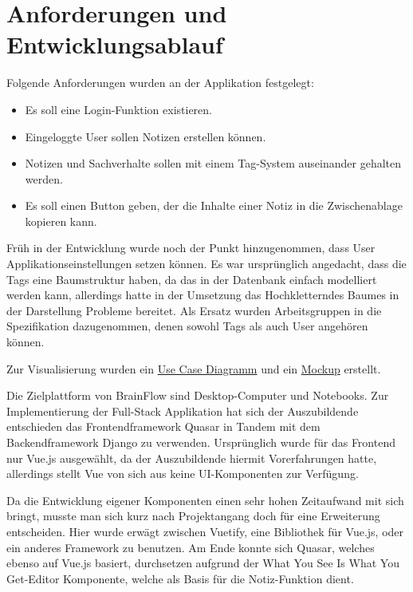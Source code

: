 \section {Anforderungen und Entwicklungsablauf}
Folgende Anforderungen wurden an der Applikation festgelegt:
    \begin{itemize}
        \item Es soll eine Login-Funktion existieren.
        \item Eingeloggte User sollen Notizen erstellen können.
        \item Notizen und Sachverhalte sollen mit einem Tag-System auseinander gehalten werden.
        \item Es soll einen Button geben, der die Inhalte einer Notiz in die Zwischenablage kopieren kann.
    \end{itemize}

\bigskip\noindent
Früh in der Entwicklung wurde noch der Punkt hinzugenommen, dass User Applikationseinstellungen setzen können. Es war ursprünglich angedacht, dass die Tags
eine Baumstruktur haben, da das in der Datenbank einfach modelliert werden kann, allerdings hatte in der Umsetzung das \flqq Hochklettern\frqq des Baumes in der Darstellung
Probleme bereitet. Als Ersatz wurden Arbeitsgruppen in die Spezifikation dazugenommen, denen sowohl Tags als auch User angehören können.

\bigskip\noindent
Zur Visualisierung wurden ein \hyperref[usecase]{Use Case Diagramm} und ein \hyperref[mockup]{Mockup} erstellt.

\bigskip\noindent
Die Zielplattform von BrainFlow sind Desktop-Computer und Notebooks. Zur Implementierung der Full-Stack Applikation hat sich der Auszubildende entschieden
das Frontendframework Quasar in Tandem mit dem Backendframework Django zu verwenden. Ursprünglich wurde für das Frontend nur Vue.js ausgewählt, da der Auszubildende hiermit
Vorerfahrungen hatte, allerdings stellt Vue von sich aus keine UI-Komponenten zur Verfügung.

\bigskip\noindent
Da die Entwicklung eigener Komponenten einen sehr hohen Zeitaufwand mit sich bringt, musste man sich kurz nach Projektangang doch für eine Erweiterung entscheiden.
Hier wurde erwägt zwischen Vuetify, eine Bibliothek für Vue.js, oder ein anderes Framework zu benutzen. Am Ende konnte sich Quasar, welches ebenso auf Vue.js basiert,
durchsetzen aufgrund der \flqq What You See Is What You Get\frqq-Editor Komponente, welche als Basis für die Notiz-Funktion dient.

